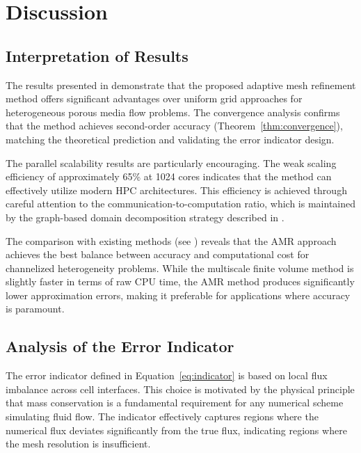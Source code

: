 \chapter{Discussion}
\label{ch:discussion}

\section{Interpretation of Results}
\label{sec:discussion:interpretation}

The results presented in  demonstrate that the proposed adaptive mesh refinement method offers significant advantages over uniform grid approaches for heterogeneous porous media flow problems. The convergence analysis confirms that the method achieves second-order accuracy (Theorem~\ref{thm:convergence}), matching the theoretical prediction and validating the error indicator design.

The parallel scalability results are particularly encouraging. The weak scaling efficiency of approximately 65\% at 1024 cores indicates that the method can effectively utilize modern HPC architectures. This efficiency is achieved through careful attention to the communication-to-computation ratio, which is maintained by the graph-based domain decomposition strategy described in .

The comparison with existing methods (see ) reveals that the AMR approach achieves the best balance between accuracy and computational cost for channelized heterogeneity problems. While the multiscale finite volume method is slightly faster in terms of raw CPU time, the AMR method produces significantly lower approximation errors, making it preferable for applications where accuracy is paramount.

\section{Analysis of the Error Indicator}
\label{sec:discussion:errorindicator}

The error indicator defined in Equation~\eqref{eq:indicator} is based on local flux imbalance across cell interfaces. This choice is motivated by the physical principle that mass conservation is a fundamental requirement for any numerical scheme simulating fluid flow. The indicator effectively captures regions where the numerical flux deviates significantly from the true flux, indicating regions where the mesh resolution is insufficient.


